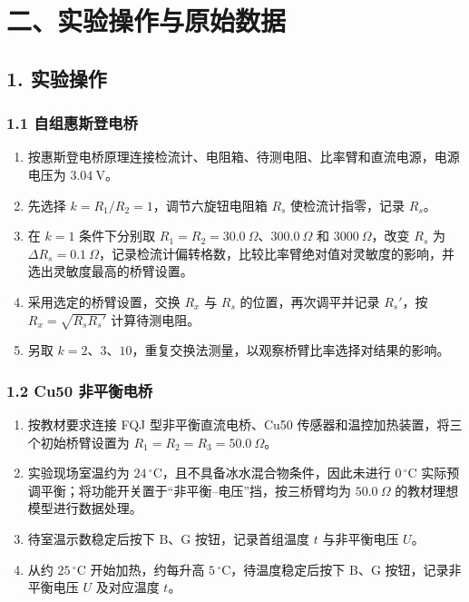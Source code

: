 \section*{二、实验操作与原始数据}

\subsection*{1. 实验操作}

\subsubsection*{1.1 自组惠斯登电桥}

\begin{enumerate}
  \item 按惠斯登电桥原理连接检流计、电阻箱、待测电阻、比率臂和直流电源，电源电压为 $3.04\ \mathrm V$。
  \item 先选择 $k=R_1/R_2=1$，调节六旋钮电阻箱 $R_s$ 使检流计指零，记录 $R_s$。
  \item 在 $k=1$ 条件下分别取 $R_1=R_2=30.0\ \Omega$、$300.0\ \Omega$ 和 $3000\ \Omega$，改变 $R_s$ 为 $\Delta R_s=0.1\ \Omega$，记录检流计偏转格数，比较比率臂绝对值对灵敏度的影响，并选出灵敏度最高的桥臂设置。
  \item 采用选定的桥臂设置，交换 $R_x$ 与 $R_s$ 的位置，再次调平并记录 $R_s'$，按 $R_x=\sqrt{R_sR_s'}$ 计算待测电阻。
  \item 另取 $k=2$、$3$、$10$，重复交换法测量，以观察桥臂比率选择对结果的影响。
\end{enumerate}

\subsubsection*{1.2 Cu50 非平衡电桥}

\begin{enumerate}
  \item 按教材要求连接 FQJ 型非平衡直流电桥、Cu50 传感器和温控加热装置，将三个初始桥臂设置为 $R_1=R_2=R_3=50.0\ \Omega$。
  \item 实验现场室温约为 $24\,{}^\circ\mathrm C$，且不具备冰水混合物条件，因此未进行 $0\,{}^\circ\mathrm C$ 实际预调平衡；将功能开关置于“非平衡--电压”挡，按三桥臂均为 $50.0\ \Omega$ 的教材理想模型进行数据处理。
  \item 待室温示数稳定后按下 B、G 按钮，记录首组温度 $t$ 与非平衡电压 $U$。
  \item 从约 $25\,{}^\circ\mathrm C$ 开始加热，约每升高 $5\,{}^\circ\mathrm C$，待温度稳定后按下 B、G 按钮，记录非平衡电压 $U$ 及对应温度 $t$。
\end{enumerate}

